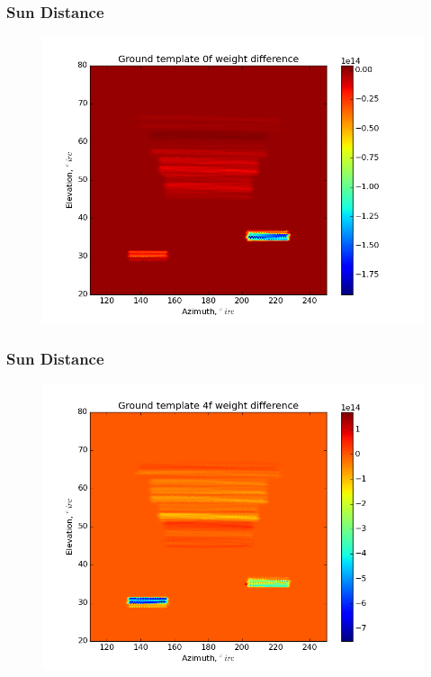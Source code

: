 \documentclass{beamer}
\begin{document}
\begin{frame}
\frametitle{Sun Distance}
\begin{figure}
\includegraphics[width=0.9\linewidth]{dw0_gt_SUN_DIST.png}
\end{figure}
\end{frame}

\begin{frame}
\frametitle{Sun Distance}
\begin{figure}
\includegraphics[width=0.9\linewidth]{dw4_gt_SUN_DIST.png}
\end{figure}
\end{frame}
\end{document}
